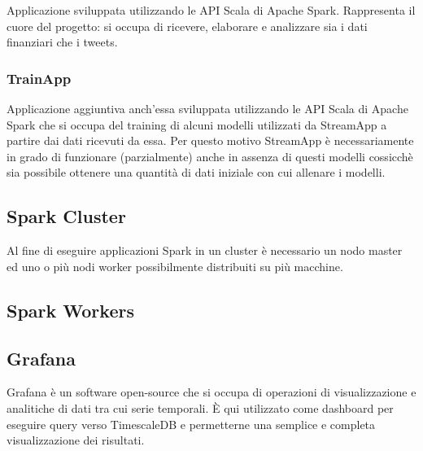 Applicazione sviluppata utilizzando le API Scala di Apache Spark. Rappresenta il cuore del progetto:
si occupa di ricevere, elaborare e analizzare sia i dati finanziari che i tweets.

\subsubsection{TrainApp}

Applicazione aggiuntiva anch'essa sviluppata utilizzando le API Scala di Apache Spark che si occupa
del training di alcuni modelli utilizzati da StreamApp a partire dai dati ricevuti da essa.
Per questo motivo StreamApp è necessariamente in grado di funzionare (parzialmente) anche in assenza
di questi modelli cossicchè sia possibile ottenere una quantità di dati iniziale con cui allenare i
modelli.

\subsection{Spark Cluster}

Al fine di eseguire applicazioni Spark in un cluster è necessario un nodo master ed uno o più nodi
worker possibilmente distribuiti su più macchine.


\subsection{Spark Workers}

\subsection{Grafana}

Grafana è un software open-source che si occupa di operazioni di visualizzazione e analitiche
di dati tra cui serie temporali. È qui utilizzato come dashboard per eseguire query verso
TimescaleDB e permetterne una semplice e completa visualizzazione dei risultati.

